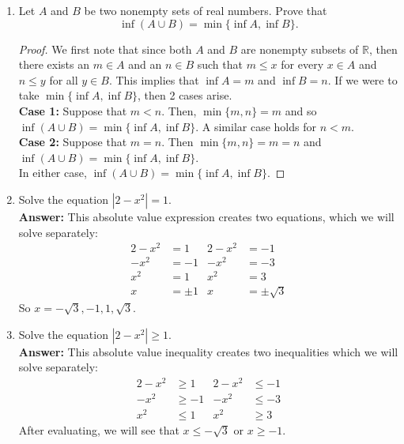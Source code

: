 \documentclass{article}
\begin{document}
\begin{enumerate}
        \item Let $A$ and $B$ be two nonempty sets of real numbers. Prove that
            \[\inf (A \cup B) = \min \{\inf A, \inf B\}.\]
            
            \begin{proof}
                We first note that since both $A$ and $B$ are nonempty subsets of $\mathbb{R}$, then there exists an $m \in A$ and an $n \in B$ such that $m \leq x$ for every $x \in A$ and $n \leq y$ for all $y \in B$. This implies that $\inf A = m$ and $\inf B = n$. If we were to take $\min\{\inf A, \inf B\}$, then 2 cases arise.\\
                
                \textbf{Case 1: } Suppose that $m < n$. Then, $\min\{m, n\} = m$ and so $\inf (A \cup B) = \min \{\inf A, \inf B\}$. A similar case holds for $n < m$.\\
                \textbf{Case 2: } Suppose that $m = n$. Then $\min\{m, n\} = m = n$ and $\inf (A \cup B) = \min \{\inf A, \inf B\}$.\\
                
                In either case, $\inf (A \cup B) = \min \{\inf A, \inf B\}$.
                
            \end{proof}
        
        \item Solve the equation $|2-x^2| = 1$.\\
            \textbf{Answer: }This absolute value expression creates two equations, which we will solve separately:
            \begin{align*}
                2-x^2 &= 1    &   2-x^2 &= -1\\
                -x^2 &= -1    &   -x^2 &= -3\\
                x^2 &= 1    &   x^2 &= 3\\
                x &= \pm 1   &   x &= \pm \sqrt{3}
            \end{align*}
            So $x = -\sqrt{3}, -1, 1, \sqrt{3}$.\\

        \item Solve the equation $|2-x^2| \geq 1$.\\
            \textbf{Answer: }This absolute value inequality creates two inequalities which we will solve separately:
            \begin{align*}
                2-x^2 &\geq 1    &   2-x^2 &\leq -1\\
                -x^2 &\geq -1    &   -x^2 &\leq -3\\
                x^2 &\leq 1    &   x^2 &\geq 3
            \end{align*}
            After evaluating, we will see that $x \leq -\sqrt{3}$ or $x \geq -1$.\\
        

\end{enumerate}
\end{document}
